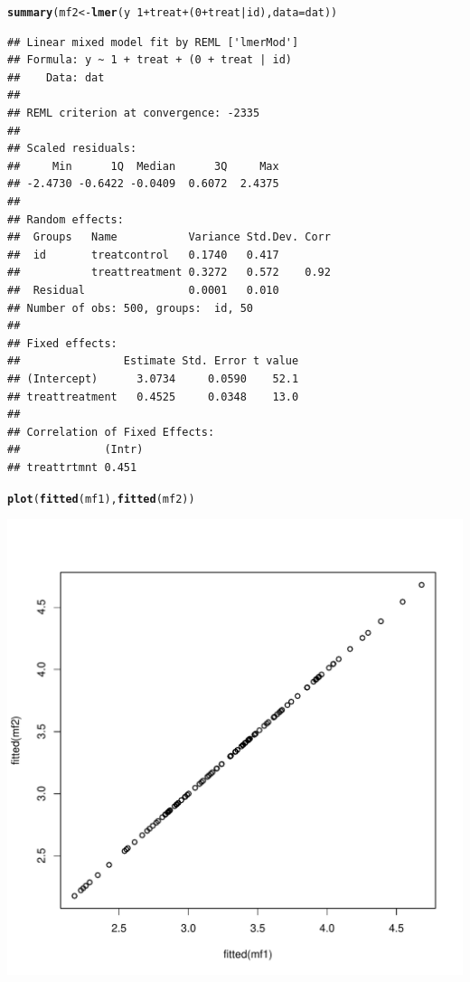 \documentclass[12pt,a4paper]{scrartcl}\usepackage[]{graphicx}\usepackage[]{color}
\makeatletter
\def\maxwidth{ %
  \ifdim\Gin@nat@width>\linewidth
    \linewidth
  \else
    \Gin@nat@width
  \fi
}
\newcommand{\hlnum}[1]{\textcolor[rgb]{0.686,0.059,0.569}{#1}}%
\newcommand{\hlopt}[1]{\textcolor[rgb]{0,0,0}{#1}}%
\newcommand{\hlstd}[1]{\textcolor[rgb]{0.345,0.345,0.345}{#1}}%
\newcommand{\hlkwb}[1]{\textcolor[rgb]{0.69,0.353,0.396}{#1}}%
\newcommand{\hlkwc}[1]{\textcolor[rgb]{0.333,0.667,0.333}{#1}}%
\newcommand{\hlkwd}[1]{\textcolor[rgb]{0.737,0.353,0.396}{\textbf{#1}}}%
\newenvironment{kframe}{%
 \def\at@end@of@kframe{}%
 \ifinner\ifhmode%
  \def\at@end@of@kframe{\end{minipage}}%
  \begin{minipage}{\columnwidth}%
 \fi\fi%
 \def\FrameCommand##1{\hskip\@totalleftmargin \hskip-\fboxsep
 \colorbox{shadecolor}{##1}\hskip-\fboxsep
     \hskip-\linewidth \hskip-\@totalleftmargin \hskip\columnwidth}%
 \MakeFramed {\advance\hsize-\width
   \@totalleftmargin\z@ \linewidth\hsize
   \@setminipage}}%
 {\par\unskip\endMakeFramed%
 \at@end@of@kframe}
\newenvironment{knitrout}{}{} %
\makeatother
\begin{document}
\begin{Answer}
\begin{knitrout}
\color{fgcolor}\begin{kframe}
\begin{alltt}
\hlkwd{summary}\hlstd{(mf2} \hlkwb{<-} \hlkwd{lmer}\hlstd{(y} \hlopt{~} \hlnum{1} \hlopt{+} \hlstd{treat} \hlopt{+} \hlstd{(}\hlnum{0}\hlopt{+}\hlstd{treat}\hlopt{|}\hlstd{id),} \hlkwc{data} \hlstd{= dat))}
\end{alltt}
\begin{verbatim}
## Linear mixed model fit by REML ['lmerMod']
## Formula: y ~ 1 + treat + (0 + treat | id)
##    Data: dat
## 
## REML criterion at convergence: -2335
## 
## Scaled residuals: 
##     Min      1Q  Median      3Q     Max 
## -2.4730 -0.6422 -0.0409  0.6072  2.4375 
## 
## Random effects:
##  Groups   Name           Variance Std.Dev. Corr
##  id       treatcontrol   0.1740   0.417        
##           treattreatment 0.3272   0.572    0.92
##  Residual                0.0001   0.010        
## Number of obs: 500, groups:  id, 50
## 
## Fixed effects:
##                Estimate Std. Error t value
## (Intercept)      3.0734     0.0590    52.1
## treattreatment   0.4525     0.0348    13.0
## 
## Correlation of Fixed Effects:
##             (Intr)
## treattrtmnt 0.451
\end{verbatim}
\begin{alltt}
\hlkwd{plot}\hlstd{(}\hlkwd{fitted}\hlstd{(mf1),} \hlkwd{fitted}\hlstd{(mf2))}
\end{alltt}
\end{kframe}
\includegraphics[width=\maxwidth]{figure/unnamed-chunk-13-1} 

\end{knitrout}
\end{Answer}
\end{document}
